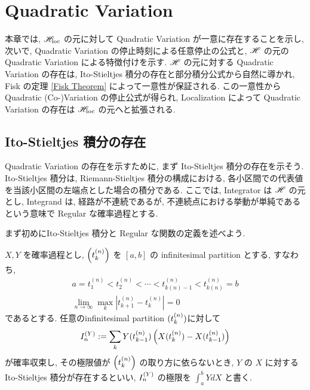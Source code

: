 \documentclass{ltjsarticle}
\begin{document}
\section{Quadratic Variation}

本章では, \( \mathscr{H}_{\mathrm{loc}} \) の元に対して Quadratic Variation が一意に存在することを示し, 次いで, Quadratic Variation の停止時刻による任意停止の公式と, \( \mathscr{H} \) の元の Quadratic Variation による特徴付けを示す.
\( \mathscr{H} \) の元に対する Quadratic Variation の存在は, Ito-Stieltjes 積分の存在と部分積分公式から自然に導かれ, Fisk の定理 \ref{Fisk Theorem} によって一意性が保証される.
この一意性から Quadratic (Co-)Variation の停止公式が得られ, Localization によって Quadratic Variation の存在は \( \mathscr{H}_{\mathrm{loc}} \) の元へと拡張される.

\subsection{Ito-Stieltjes 積分の存在}
Quadratic Variation の存在を示すために, まず Ito-Stieltjes 積分の存在を示そう.
Ito-Stieltjes 積分は, Riemann-Stieltjes 積分の構成における, 各小区間での代表値を当該小区間の左端点とした場合の積分である.
ここでは, Integrator は \( \mathscr{H} \) の元とし, Integrand は, 経路が不連続であるが, 不連続点における挙動が単純であるという意味で Regular な確率過程とする.

まず初めにIto-Stieltjes 積分と Regular な関数の定義を述べよう.

\begin{dfn} \label{def: Ito-Stieltjes}
	\( X, Y \) を確率過程とし, \( \left( t_k^{(n)} \right) \) を \( [a,b] \) の infinitesimal partition とする, すなわち, 
	\begin{gather*}
		a = t_1^{(n)} < t_2^{(n)} < \cdots < t_{ k(n)-1 }^{(n)} < t_{ k(n) }^{(n)} = b
		\\
		\lim_{ n \to \infty } \max_k \left| t_{ k + 1 }^{(n)} -t_{ k }^{(n)} \right| =0
	\end{gather*}
	であるとする.
	任意のinfinitesimal partition \( (t_k^{(n)}) \)に対して
	\[
		I_n^{ (Y) } := \sum_k Y(t_{k-1}^{(n)}) \left( X(t_k^{(n)}) - X( t_{k-1}^{(n)}) \right)
	\]
	が確率収束し, その極限値が \( \left( t_k^{(n)} \right) \) の取り方に依らないとき, \( Y \) の \( X \) に対する
	Ito-Stieltjes 積分が存在するといい, \( I_n^{ (Y) } \) の極限を \( \int_a^b Y dX \) と書く.
	\fin\end{dfn}
\end{document}
